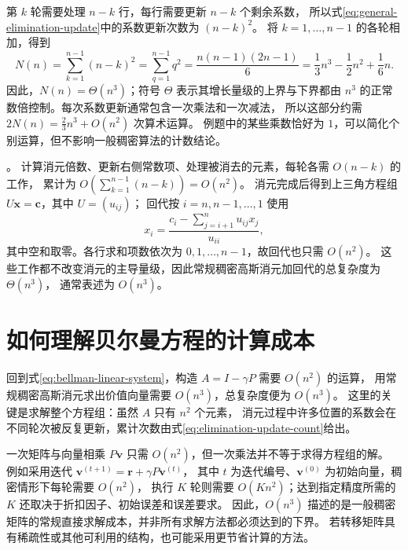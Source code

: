 \documentclass[UTF8,12pt,a4paper,fontset=fandol]{ctexart}
\begin{document}
第 $k$ 轮需要处理 $n-k$ 行，每行需要更新 $n-k$ 个剩余系数，
所以式\eqref{eq:general-elimination-update}中的系数更新次数为 $(n-k)^2$。
将 $k=1,\ldots,n-1$ 的各轮相加，得到
\begin{equation}
  N(n)=\sum_{k=1}^{n-1}(n-k)^2
  =\sum_{q=1}^{n-1}q^2
  =\frac{n(n-1)(2n-1)}6
  =\frac13n^3-\frac12n^2+\frac16n.
  \label{eq:elimination-update-count}
\end{equation}
因此，$N(n)=\Theta(n^3)$；符号 $\Theta$ 表示其增长量级的上界与下界都由
$n^3$ 的正常数倍控制。每次系数更新通常包含一次乘法和一次减法，
所以这部分约需 $2N(n)=\frac23n^3+O(n^2)$ 次算术运算。
例题中的某些乘数恰好为 $1$，可以简化个别运算，但不影响一般稠密算法的计数结论。

。
计算消元倍数、更新右侧常数项、处理被消去的元素，每轮各需 $O(n-k)$ 的工作，
累计为 $O(\sum_{k=1}^{n-1}(n-k))=O(n^2)$。
消元完成后得到上三角方程组 $U\boldsymbol x=\boldsymbol c$，其中 $U=(u_{ij})$；
回代按 $i=n,n-1,\ldots,1$ 使用
\[
  x_i=\frac{c_i-\sum_{j=i+1}^{n}u_{ij}x_j}{u_{ii}},
\]
其中空和取零。各行求和项数依次为 $0,1,\ldots,n-1$，故回代也只需 $O(n^2)$。
这些工作都不改变消元的主导量级，因此常规稠密高斯消元加回代的总复杂度为 $\Theta(n^3)$，
通常表述为 $O(n^3)$。

\section{如何理解贝尔曼方程的计算成本}

回到式\eqref{eq:bellman-linear-system}，构造 $A=I-\gamma P$ 需要 $O(n^2)$ 的运算，
用常规稠密高斯消元求出价值向量需要 $O(n^3)$，总复杂度便为 $O(n^3)$。
这里的关键是求解整个方程组：虽然 $A$ 只有 $n^2$ 个元素，
消元过程中许多位置的系数会在不同轮次被反复更新，累计次数由式\eqref{eq:elimination-update-count}给出。

一次矩阵与向量相乘 $P\boldsymbol v$ 只需 $O(n^2)$，但一次乘法并不等于求得方程组的解。
例如采用迭代 $\boldsymbol v^{(t+1)}=\boldsymbol r+\gamma P\boldsymbol v^{(t)}$，
其中 $t$ 为迭代编号、$\boldsymbol v^{(0)}$ 为初始向量，稠密情形下每轮需要 $O(n^2)$，
执行 $K$ 轮则需要 $O(Kn^2)$；达到指定精度所需的 $K$ 还取决于折扣因子、初始误差和误差要求。
因此，$O(n^3)$ 描述的是一般稠密矩阵的常规直接求解成本，并非所有求解方法都必须达到的下界。
若转移矩阵具有稀疏性或其他可利用的结构，也可能采用更节省计算的方法。
\end{document}
